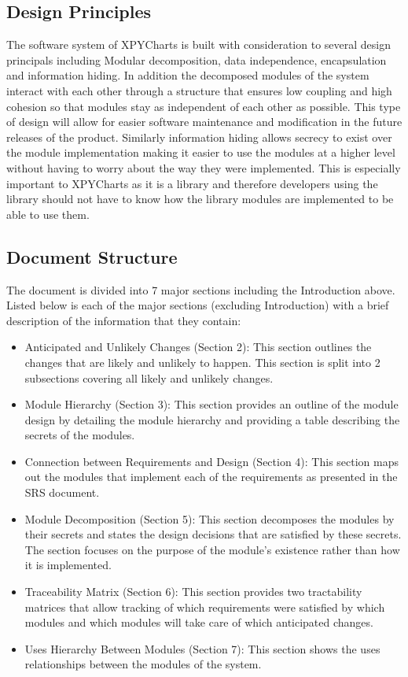 \documentclass[12pt, titlepage]{article}
\begin{document}
\subsection{Design Principles}
The software system of XPYCharts is built with consideration to several design principals including Modular decomposition, data independence, encapsulation and information hiding. In addition the decomposed modules of the system interact with each other through a structure that ensures low coupling and high cohesion so that modules stay as independent of each other as possible. This type of design will allow for easier software maintenance and modification in the future releases of the product. Similarly information hiding allows secrecy to exist over the module implementation making it easier to use the modules at a higher level without having to worry about the way they were implemented. This is especially important to XPYCharts as it is a library and therefore developers using the library should not have to know how the library modules are implemented to be able to use them.
\subsection{Document Structure}
The document is divided into 7 major sections including the Introduction above. Listed below is each of the major sections (excluding Introduction) with a brief description of the information that they contain:
\begin{itemize}
\item Anticipated and Unlikely Changes (Section 2): This section outlines the changes that are likely and unlikely to happen. This section is split into 2 subsections covering all likely and unlikely changes.
\item Module Hierarchy (Section 3): This section provides an outline of the module design by detailing the module hierarchy and providing a table describing the secrets of the modules.
\item Connection between Requirements and Design (Section 4): This section maps out the modules that implement each of the requirements as presented in the SRS document.
\item Module Decomposition (Section 5): This section decomposes the modules by their secrets and states the design decisions that are satisfied by these secrets. The section focuses on the purpose of the module’s existence rather than how it is implemented.
\item Traceability Matrix (Section 6): This section provides two tractability matrices that allow tracking of which requirements were satisfied by which modules and which modules will take care of which anticipated changes.
\item Uses Hierarchy Between Modules (Section 7): This section shows the uses relationships between the modules of the system.
\end{itemize}
\end{document}
